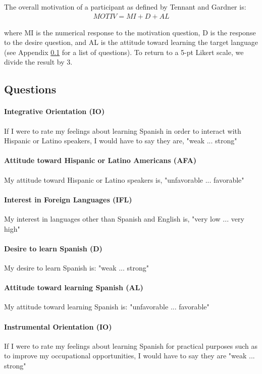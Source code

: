 The overall motivation of a participant as defined by Tennant and Gardner is:
\begin{align*}
    MOTIV = MI + D + AL\label{eq:motiv}
\end{align*}

where MI is the numerical response to the motivation question, D is the response to the desire question, and AL is the attitude toward learning the target language (see Appendix \ref{app:motiv} for a list of questions). To return to a 5-pt Likert scale, we divide the result by 3.
\subsection{Questions}
\label{app:motiv}
\paragraph{Integrative Orientation (IO)} If I were to rate my feelings about learning Spanish in order to interact with Hispanic or Latino speakers, I would have to say they are, "weak ... strong" 
\paragraph{Attitude toward Hispanic or Latino Americans (AFA)} My attitude toward Hispanic or Latino speakers is, "unfavorable ... favorable" 
\paragraph{Interest in Foreign Languages (IFL)} My interest in languages other than Spanish and English is, "very low ... very high"
\paragraph{Desire to learn Spanish (D)} My desire to learn Spanish is: "weak ... strong"
\paragraph{Attitude toward learning Spanish (AL)} My attitude toward learning Spanish is: "unfavorable ... favorable"
\paragraph{Instrumental Orientation (IO)} If I were to rate my feelings about learning Spanish for practical purposes such as to improve my occupational opportunities, I would have to say they are "weak ... strong"
